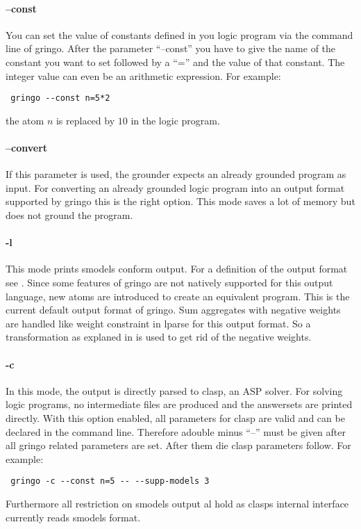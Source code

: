 \documentclass[a4paper,10pt]{article}
\begin{document}
\paragraph{--const}
You can set the value of constants defined in you logic program via the command line of gringo.
After the parameter ``--const'' you have to give the name of the constant you want to set followed by a ``='' and the value of that constant. The integer value can even be an arithmetic expression. For example:
\begin{verbatim}
 gringo --const n=5*2
\end{verbatim}
the atom $n$ is replaced by $10$ in the logic program.

\paragraph{--convert}
If this parameter is used, the grounder expects an already grounded program as input.
For converting an already grounded logic program into an output format supported by gringo this is the right option. This mode saves a lot of memory but does not ground the program.
\paragraph{-l}
This mode prints smodels conform output. For a definition of the output format see \cite{lparseManual}.
Since some features of gringo are not natively supported for this output language, new atoms are introduced to create an equivalent program.\newline
This is the current default output format of gringo.
Sum aggregates with negative weights are handled like weight constraint in lparse for this output format. So a transformation as explaned in \cite{lparseManual} is used to get rid of the negative weights.
\paragraph{-c}
In this mode, the output is directly parsed to clasp, an ASP solver. For solving logic programs, no intermediate files are produced and the answersets are printed directly.
With this option enabled, all parameters for clasp are valid and can be declared in the command line. Therefore adouble minus ``--'' must be given after all gringo related parameters are set. After them die clasp parameters follow.
For example:
\begin{verbatim}
 gringo -c --const n=5 -- --supp-models 3
\end{verbatim}
Furthermore all restriction on smodels output al hold as clasps internal interface currently reads smodels format.
\end{document}

